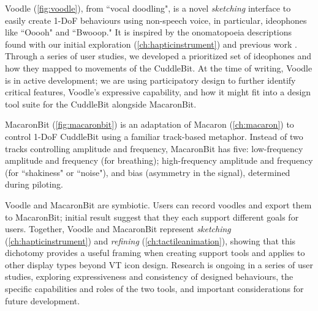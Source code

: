 Voodle (\autoref{fig:voodle}), from ``vocal doodling", is a novel \emph{sketching} interface to easily create 1-DoF behaviours using non-speech voice, in particular, ideophones \cite{Dingemanse2012} like ``Ooooh" and ``Bwooop."
It is inspired by the onomatopoeia descriptions found with our initial exploration (\autoref{ch:hapticinstrument}) and previous work \cite{Seifi2015,Watanabe2012}.
Through a series of user studies, we developed a prioritized set of ideophones and how they mapped to movements of the CuddleBit.
At the time of writing, Voodle is in active development; we are using participatory design to further identify critical features, Voodle's expressive capability, and how it might fit into a design tool suite for the CuddleBit alongside MacaronBit.

MacaronBit (\autoref{fig:macaronbit}) is an adaptation of Macaron (\autoref{ch:macaron}) to control 1-DoF CuddleBit using a familiar track-based metaphor.
Instead of two tracks controlling amplitude and frequency, MacaronBit has five: low-frequency amplitude and frequency (for breathing); high-frequency amplitude and frequency (for ``shakiness" or ``noise"), and bias (asymmetry in the signal), determined during piloting.

Voodle and MacaronBit are symbiotic.
Users can record voodles and export them to MacaronBit; initial result suggest that they each support different goals for users.
Together, Voodle and MacaronBit represent \emph{sketching} (\autoref{ch:hapticinstrument}) and \emph{refining} (\autoref{ch:tactileanimation}), showing that this dichotomy provides a useful framing when creating \haxd support tools and applies to other display types beyond VT icon design.
Research is ongoing in a series of user studies, exploring expressiveness and consistency of designed behaviours, the specific capabilities and roles of the two tools, and important considerations for future development.


\endinput

